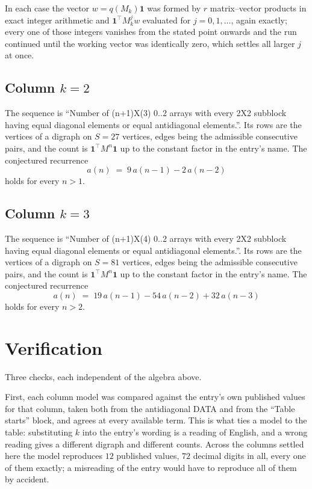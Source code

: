 \documentclass[11pt,a4paper]{article}
\theoremstyle{plain}
\theoremstyle{definition}
\begin{document}
In each case the vector $w=q(M_k)\mathbf{1}$ was formed by $r$ matrix--vector products in
exact integer arithmetic and $\mathbf{1}^{\!\top}M_k^{j}w$ evaluated for $j=0,1,\dots$,
again exactly; every one of those integers vanishes from the stated point onwards and the run
continued until the working vector was identically zero, which settles all larger $j$ at once.

\subsection*{Column $k=2$}
The sequence is ``Number of (n+1)X(3) 0..2 arrays with every 2X2 subblock having equal diagonal elements or equal antidiagonal elements.''. Its rows are the vertices of a digraph on
$S=27$ vertices, edges being the admissible consecutive pairs, and the count is
$\mathbf{1}^{\!\top}M^{n}\mathbf{1}$ up to the constant factor in the entry's name.
The conjectured recurrence
\[
a(n)\;=\;9\,a(n-1) - 2\,a(n-2)
\]
holds for every $n>1$.

\subsection*{Column $k=3$}
The sequence is ``Number of (n+1)X(4) 0..2 arrays with every 2X2 subblock having equal diagonal elements or equal antidiagonal elements.''. Its rows are the vertices of a digraph on
$S=81$ vertices, edges being the admissible consecutive pairs, and the count is
$\mathbf{1}^{\!\top}M^{n}\mathbf{1}$ up to the constant factor in the entry's name.
The conjectured recurrence
\[
a(n)\;=\;19\,a(n-1) - 54\,a(n-2) + 32\,a(n-3)
\]
holds for every $n>2$.

\section{Verification}

Three checks, each independent of the algebra above.

First, each column model was compared against the entry's own published values for that
column, taken both from the antidiagonal DATA and from the ``Table starts'' block, and agrees
at every available term. This is what ties a model to the table: substituting $k$ into the
entry's wording is a reading of English, and a wrong reading gives a different digraph and
different counts. Across the columns settled here the model reproduces $12$ published
values, $72$ decimal digits in all, every one of them exactly; a misreading of the entry
would have to reproduce all of them by accident.
\end{document}
